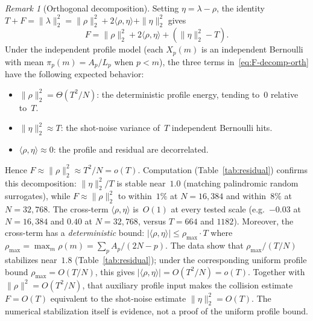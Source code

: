 \documentclass[11pt]{article}
\theoremstyle{definition}
\theoremstyle{remark}
\newtheorem{remark}[theorem]{Remark}
\begin{document}
\begin{remark}[Orthogonal decomposition]\label{rem:orthogonal}
Setting $\eta = \lambda - \rho$,
the identity
$T + F = \|\lambda\|_2^2
= \|\rho\|_2^2 + 2\langle \rho, \eta \rangle
  + \|\eta\|_2^2$
gives
\begin{equation}\label{eq:F-decomp-orth}
  F = \|\rho\|_2^2
      + 2\langle \rho, \eta \rangle
      + (\|\eta\|_2^2 - T).
\end{equation}
Under the independent profile model
(each $X_p(m)$ is an independent
Bernoulli with mean $\pi_p(m) = A_p/L_p$
when $p < m$), the three terms
in~\eqref{eq:F-decomp-orth} have the
following expected behavior:
\begin{itemize}
\item $\|\rho\|_2^2 = \Theta(T^2/N)$:
the deterministic profile energy,
tending to~$0$ relative to~$T$.
\item $\|\eta\|_2^2 \approx T$:
the shot-noise variance of~$T$
independent Bernoulli hits.
\item $\langle \rho, \eta \rangle \approx 0$:
the profile and residual are decorrelated.
\end{itemize}
Hence $F \approx \|\rho\|_2^2
\approx T^2/N = o(T)$.
Computation (Table~\ref{tab:residual})
confirms this decomposition:
$\|\eta\|_2^2/T$ is stable near~$1.0$
(matching palindromic random surrogates),
while $F \approx \|\rho\|_2^2$
to within~$1\%$ at $N = 16{,}384$
and within~$8\%$ at $N = 32{,}768$.
The cross-term $\langle \rho, \eta \rangle$
is~$O(1)$ at every tested scale
(e.g.\ $-0.03$ at $N = 16{,}384$
and $0.40$ at $N = 32{,}768$,
versus $T = 664$ and $1182$).
Moreover, the cross-term has a
\emph{deterministic} bound:
$|\langle \rho, \eta \rangle|
\le \rho_{\max} \cdot T$
where $\rho_{\max} = \max_{m} \rho(m)
= \sum_p A_p/(2N{-}p)$.
The data show that $\rho_{\max}/(T/N)$ stabilizes
near~$1.8$ (Table~\ref{tab:residual}); under the corresponding
uniform profile bound $\rho_{\max}=O(T/N)$, this gives
$|\langle \rho, \eta \rangle|=O(T^2/N)=o(T)$.
Together with $\|\rho\|^2=O(T^2/N)$, that auxiliary profile
input makes the collision estimate $F=O(T)$ equivalent to the
shot-noise estimate $\|\eta\|_2^2=O(T)$.  The numerical
stabilization itself is evidence, not a proof of the uniform
profile bound.
\end{remark}
\end{document}
